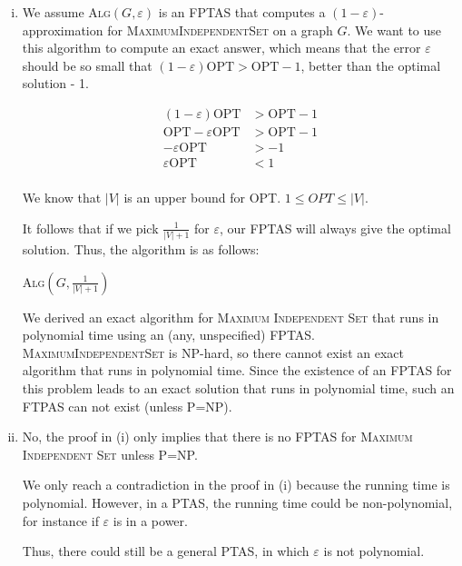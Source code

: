\begin{enumerate}[(i)]
	\item We assume \textsc{Alg}$(G, \varepsilon)$ is an FPTAS that computes a $(1 - \varepsilon)$-approximation for \textsc{MaximumIndependentSet} on a graph $G$.
		We want to use this algorithm to compute an exact answer, which means that the error $\varepsilon$ should be so small that $(1 - \varepsilon) \text{OPT} > \text{OPT} - 1$, better than the optimal solution - 1.

		\begin{equation}
		\begin{split}
			(1 - \varepsilon) \text{OPT} &> \text{OPT} - 1\\
			\text{OPT} - \varepsilon \text{OPT} &> \text{OPT} - 1\\
			- \varepsilon \text{OPT}& > -1\\
			\varepsilon \text{OPT} &< 1\\
		\end{split}
		\end{equation}

		We know that $|V|$ is an upper bound for OPT.
		$1 \leq OPT \leq |V|$.

		It follows that if we pick $\frac{1}{|V|+1}$ for $\varepsilon$, our FPTAS will always give the optimal solution.
		Thus, the algorithm is as follows:

\begin{sourcecode}
\return \textsc{Alg}$(G, \frac{1}{|V| + 1})$
\qend
\end{sourcecode}

		We derived an exact algorithm for \textsc{Maximum Independent Set} that runs in polynomial time using an (any, unspecified) FPTAS.
		\textsc{MaximumIndependentSet} is NP-hard, so there cannot exist an exact algorithm that runs in polynomial time.
		Since the existence of an FPTAS for this problem leads to an exact solution that runs in polynomial time, such an FTPAS can not exist (unless P=NP).

	\item No, the proof in (i) only implies that there is no FPTAS for \textsc{Maximum Independent Set} unless P=NP.

		We only reach a contradiction in the proof in (i) because the running time is polynomial.
		However, in a PTAS, the running time could be non-polynomial, for instance if $\varepsilon$ is in a power.

		Thus, there could still be a general PTAS, in which $\varepsilon$ is not polynomial.
\end{enumerate}

